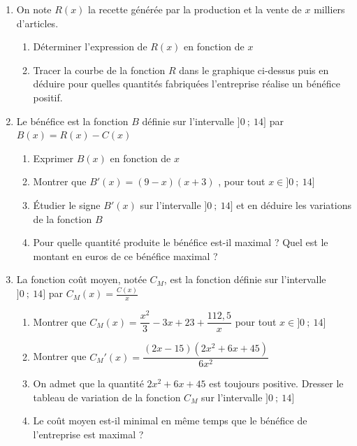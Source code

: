 \documentclass[oneside,12pt]{article}          %
\begin{document}

\begin{enumerate}
	\item On note $R(x)$ la recette générée par la production et la vente de $x$ milliers d'articles.
	\begin{enumerate}
		\item Déterminer l'expression de $R(x)$ en fonction de $x$
		\item Tracer la courbe de la fonction $R$ dans le graphique ci-dessus puis en déduire pour quelles quantités fabriquées l'entreprise réalise un bénéfice positif.
	\end{enumerate}
	
	\item Le bénéfice est la fonction $B$ définie sur l'intervalle $]0 ~;~ 14]$ par $B(x)=R(x)-C(x)$
	\begin{enumerate}
		\item Exprimer $B(x)$ en fonction de $x$
		\item Montrer que $B'(x) = (9-x)(x+3)$ , \quad pour tout $x \in ]0 ~;~ 14]$
		\item Étudier le signe $B'(x)$ sur l'intervalle $]0 ~;~ 14]$ et en déduire les variations de la fonction $B$
		\item Pour quelle quantité produite le bénéfice est-il maximal ? Quel est le montant en euros de ce bénéfice maximal ?
	\end{enumerate}
	
	\item La fonction coût moyen, notée $C_M$, est la fonction définie sur l'intervalle $]0 ~;~ 14]$ par $C_M(x)=\frac{C(x)}{x}$
	\begin{enumerate}
		\item Montrer que $C_M(x) =  \dfrac{x^2}{3} - 3x + 23 + \dfrac{112,5}{x}$ \quad pour tout $x \in ]0 ~;~ 14]$
		\item Montrer que ${C_M}'(x) = \dfrac{(2x - 15)(2x^2 + 6x + 45)}{6x^2}$
		\item On admet que la quantité $2x^2 + 6x + 45$ est toujours positive. Dresser le tableau de variation de la fonction $C_M$ sur l'intervalle $]0 ~;~ 14]$
		\item Le coût moyen est-il minimal en même temps que le bénéfice de l'entreprise est maximal ?
	\end{enumerate}
\end{enumerate}
\end{document}
